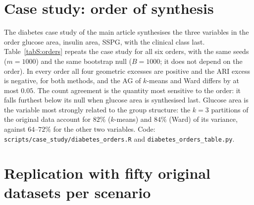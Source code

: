 \documentclass[pdflatex,referee]{sn-jnl}
\begin{document}
\begin{table}[ht]
\centering
\caption{Partition agreement (ARI) between each original dataset and the
  transfer of the synthetic partition onto its points, at the planted $k$, with
  the bootstrap null ($\mathrm{ARI}_0$, $B = 30$), the excess (ARI minus
  $\mathrm{ARI}_0$) and the Ward ceiling (the $k$-means ceiling is $1$). Means
  of the scenario-level means over the 144 scenarios, 72 per distribution and 36
  per separation level.}
\label{tabS:ari}
\small

\end{table}

\section{Case study: order of synthesis}\label{secS:orders}

The diabetes case study of the main article synthesises the three variables in
the order glucose area, insulin area, SSPG, with the clinical class last.
Table~\ref{tabS:orders} repeats the case study for all six orders, with the same
seeds ($m = 1000$) and the same bootstrap null ($B = 1000$; it does not depend on
the order). In every order all four geometric excesses are positive and the ARI
excess is negative, for both methods, and the AG of $k$-means and Ward differs
by at most $0.05$. The count agreement is the quantity most sensitive to the
order: it falls furthest below its null when glucose area is synthesised last. Glucose area is the variable most
strongly related to the group structure: the $k = 3$ partitions of the original
data account for $82\%$ ($k$-means) and $84\%$ (Ward) of its variance, against
$64$--$72\%$ for the other two variables. Code:
\texttt{scripts/case\_study/diabetes\_orders.R} and
\texttt{diabetes\_orders\_table.py}.

\begin{table}[ht]
\centering
\caption{Diabetes case study under the six orders of synthesis
  (G = glucose area, I = insulin area, S = SSPG; clinical class always last).
  AG is the share of synthetic datasets reproducing the original $\hat k$;
  the remaining columns are the excess over the bootstrap null, with AG at the
  silhouette-selected $\hat k$ and the other metrics at $k = 3$.}
\label{tabS:orders}
\small\setlength{\tabcolsep}{3.5pt}

\end{table}

\section{Replication with fifty original datasets per scenario}\label{secS:n50}
\end{document}
